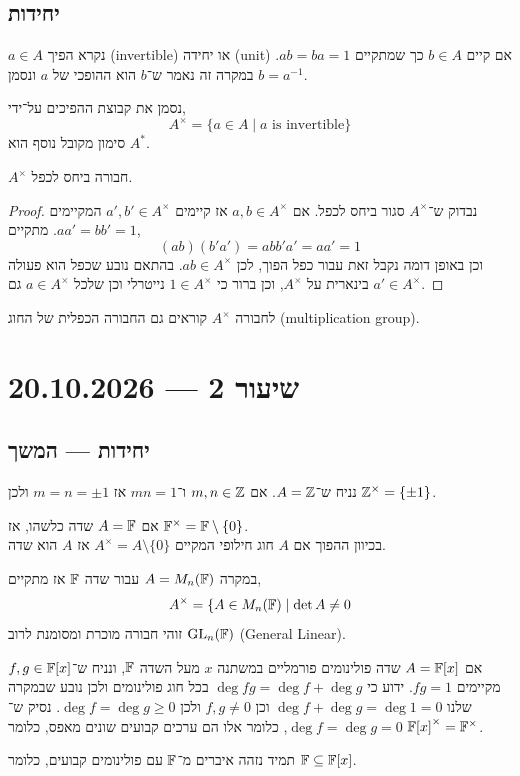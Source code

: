 \subsection{יחידות}
\begin{definition}
	$a \in A$ נקרא הפיך (invertible) או יחידה (unit) אם קיים $b \in A$ כך שמתקיים $a b = b a = 1$.
	במקרה זה נאמר ש־$b$ הוא ההופכי של $a$ ונסמן $b = a^{-1}$.
\end{definition}
\begin{notation}
	נסמן את קבוצת ההפיכים על־ידי,
	\[
		A^{\times}
		= \{ a \in A \mid a \text{ is invertible} \}
	\]
	סימון מקובל נוסף הוא $A^*$.
\end{notation}
\begin{proposition}
	$A^\times$ חבורה ביחס לכפל.
\end{proposition}
\begin{proof}
	נבדוק ש־$A^\times$ סגור ביחס לכפל.
	אם $a, b \in A^\times$ אז קיימים $a', b' \in A^\times$ המקיימים $a a' = b b' = 1$.
	מתקיים,
	\[
		(a b) (b' a')
		= a b b' a'
		= a a'
		= 1
	\]
	וכן באופן דומה נקבל זאת עבור כפל הפוך, לכן $a b \in A^\times$.
	בהתאם נובע שכפל הוא פעולה בינארית על $A^\times$, וכן ברור כי $1 \in A^\times$ נייטרלי וכן שלכל $a \in A^\times$ גם $a' \in A^\times$.
\end{proof}
לחבורה $A^\times$ קוראים גם החבורה הכפלית של החוג (multiplication group).

\section{שיעור 2 --- 20.10.2026}
\subsection{יחידות --- המשך}
\begin{example}
	נניח ש־$A = \mathbb{Z}$.
	אם $m, n \in \mathbb{Z}$ ו־$m n = 1$ אז $m = n = \pm 1$ ולכן $\mathbb{Z}^\times = \{ \pm 1 \}$.
\end{example}
\begin{example}
	אם $A = \mathbb{F}$ שדה כלשהו, אז $\mathbb{F}^\times = \mathbb{F} \setminus \{ 0 \}$. \\
	בכיוון ההפוך אם $A$ חוג חילופי המקיים $A^\times = A \setminus \{ 0 \}$ אז $A$ הוא שדה.
\end{example}
\begin{example}
	במקרה $A = M_n(\mathbb{F})$ עבור שדה $\mathbb{F}$ אז מתקיים,
	\[
		A^\times
		= \{ A \in M_n(\mathbb{F}) \mid \det A \ne 0
	\]
	זוהי חבורה מוכרת ומסומנת לרוב $\operatorname{GL}_n(\mathbb{F})$ (General Linear).
\end{example}
\begin{example}
	אם $A = \mathbb{F}[x]$ שדה פולינומים פורמליים במשתנה $x$ מעל השדה $\mathbb{F}$,
	ונניח ש־$f, g \in \mathbb{F}[x]$ מקיימים $f g = 1$.
	ידוע כי $\deg fg = \deg f + \deg g$ בכל חוג פולינומים ולכן נובע שבמקרה שלנו $\deg f + \deg g = \deg 1 = 0$ וכן $f, g \ne 0$ ולכן $\deg f = \deg g \ge 0$.
	נסיק ש־$\deg f = \deg g = 0$, כלומר אלו הם ערכים קבועים שונים מאפס, כלומר ${\mathbb{F}[x]}^\times = \mathbb{F}^\times$.
\end{example}
\begin{remark}
	תמיד נזהה איברים מ־$\mathbb{F}$ עם פולינומים קבועים, כלומר $\mathbb{F} \subseteq \mathbb{F}[x]$.
\end{remark}

